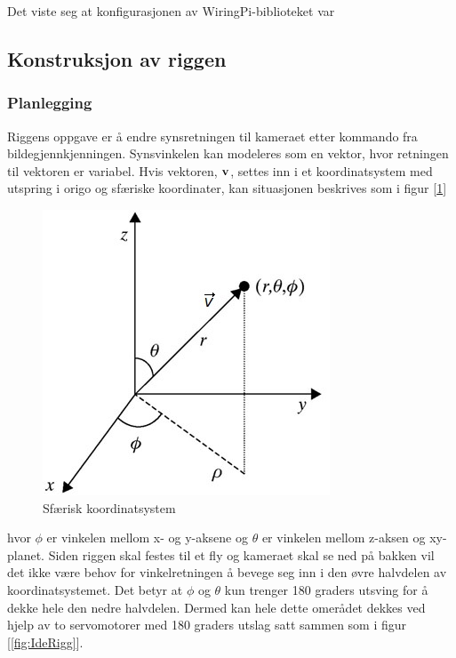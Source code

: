 Det viste seg at konfigurasjonen av WiringPi-biblioteket var    

\subsection{Konstruksjon av riggen}

\subsubsection{Planlegging}
Riggens oppgave er å endre synsretningen til kameraet etter kommando fra bildegjennkjenningen. Synsvinkelen kan modeleres som en vektor, hvor retningen til vektoren er variabel. Hvis vektoren, $\bf{v}$, settes inn i et koordinatsystem med utspring i origo og sfæriske koordinater, kan situasjonen beskrives som i figur [\ref{fig:spher}]

\begin{figure}[h!]
	\centering
	\includegraphics[scale=0.5]{img/RettVek.jpg}
	\caption{Sfærisk koordinatsystem}
	\label{fig:spher}
\end{figure}

hvor $\phi$ er vinkelen mellom x- og y-aksene og $\theta$ er vinkelen mellom z-aksen og xy-planet. Siden riggen skal festes til et fly og kameraet skal se ned på bakken vil det ikke være behov for vinkelretningen å bevege seg inn i den øvre halvdelen av koordinatsystemet. Det betyr at $\phi$ og $\theta$ kun trenger 180 graders utsving for å dekke hele den nedre halvdelen. Dermed kan hele dette omerådet dekkes ved hjelp av to servomotorer med 180 graders utslag satt sammen som i figur [\ref{fig:IdeRigg}]. 

